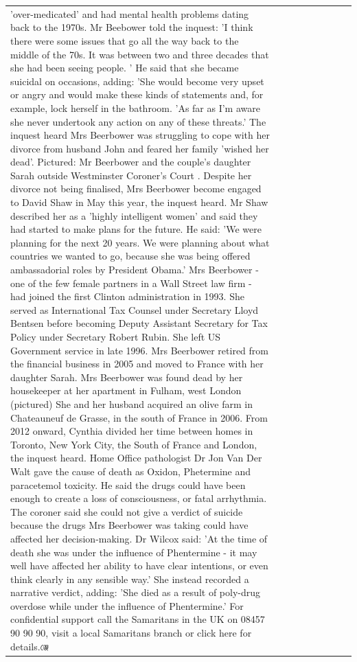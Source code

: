 \begin{table}[H]
\begin{tabular}{lllrlllll}
'over-medicated' and had mental health problems dating back to the 1970s. Mr Beebower told the inquest: 'I think there were some issues that go all the way back to the middle of the 70s. It was between two and three decades that she had been seeing people. ' He said that she became suicidal on occasions, adding: 'She would become very upset or angry and would make these kinds of statements and, for example, lock herself in the bathroom. 'As far as I'm aware she never undertook any action on any of these threats.' The inquest heard Mrs Beerbower was struggling to cope with her divorce from husband John and feared her family 'wished her dead'. Pictured: Mr Beerbower and the couple's daughter Sarah outside Westminster Coroner's Court . Despite her divorce not being finalised, Mrs Beerbower become engaged to David Shaw in May this year, the inquest heard. Mr Shaw described her as a 'highly intelligent women' and said they had started to make plans for the future. He said: 'We were planning for the next 20 years. We were planning about what countries we wanted to go, because she was being offered ambassadorial roles by President Obama.' Mrs Beerbower - one of the few female partners in a Wall Street law firm - had joined the first Clinton administration in 1993. She served as International Tax Counsel under Secretary Lloyd Bentsen before becoming Deputy Assistant Secretary for Tax Policy under Secretary Robert Rubin. She left US Government service in late 1996. Mrs Beerbower retired from the financial business in 2005 and moved to France with her daughter Sarah. Mrs Beerbower was found dead by her housekeeper at her apartment in Fulham, west London (pictured) She and her husband acquired an olive farm in Chateauneuf de Grasse, in the south of France in 2006. From 2012 onward, Cynthia divided her time between homes in Toronto, New York City, the South of France and London, the inquest heard. Home Office pathologist Dr Jon Van Der Walt gave the cause of death as Oxidon, Phetermine and paracetemol toxicity. He said the drugs could have been enough to create a loss of consciousness, or fatal arrhythmia. The coroner said she could not give a verdict of suicide because the drugs Mrs Beerbower was taking could have affected her decision-making. Dr Wilcox said: 'At the time of death she was under the influence of Phentermine - it may well have affected her ability to have clear intentions, or even think clearly in any sensible way.' She instead recorded a narrative verdict, adding: 'She died as a result of poly-drug overdose while under the influence of Phentermine.' For confidential support call the Samaritans in the UK on 08457 90 90 90, visit a local Samaritans branch or click here for details.ঞ্জে \\

\end{tabular}
\end{table}
